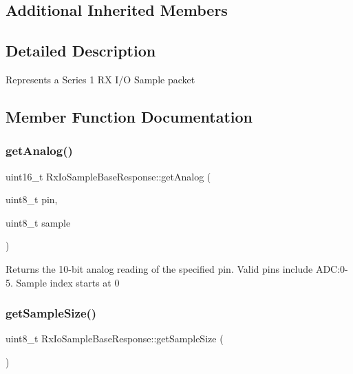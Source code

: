 \subsection*{Additional Inherited Members}


\subsection{Detailed Description}
Represents a Series 1 RX I/O Sample packet 

\subsection{Member Function Documentation}
\hypertarget{class_rx_io_sample_base_response_a81e98b2eab33f62e6af6b3b4014e841a}{}\label{class_rx_io_sample_base_response_a81e98b2eab33f62e6af6b3b4014e841a} 
\subsubsection{\texorpdfstring{get\+Analog()}{getAnalog()}}
{\footnotesize\ttfamily uint16\+\_\+t Rx\+Io\+Sample\+Base\+Response\+::get\+Analog (\begin{DoxyParamCaption}\item[{uint8\+\_\+t}]{pin,  }\item[{uint8\+\_\+t}]{sample }\end{DoxyParamCaption})}

Returns the 10-\/bit analog reading of the specified pin. Valid pins include A\+DC\+:0-\/5. Sample index starts at 0 \hypertarget{class_rx_io_sample_base_response_a44ce66a6751e7e39c8908fe179a21d24}{}\label{class_rx_io_sample_base_response_a44ce66a6751e7e39c8908fe179a21d24} 
\subsubsection{\texorpdfstring{get\+Sample\+Size()}{getSampleSize()}}
{\footnotesize\ttfamily uint8\+\_\+t Rx\+Io\+Sample\+Base\+Response\+::get\+Sample\+Size (\begin{DoxyParamCaption}{ }\end{DoxyParamCaption})}

